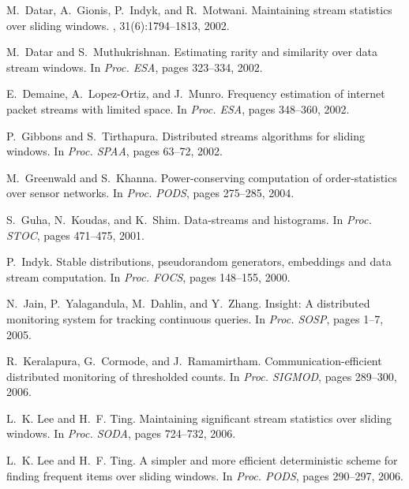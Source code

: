 \documentclass[proceedings]{stacs}
\theoremstyle{definition}\newtheorem{fact}{Fact}
\begin{document}
\begin{thebibliography}{10}
M.~Datar, A.~Gionis, P.~Indyk, and R.~Motwani.
\newblock Maintaining stream statistics over sliding windows.
, 31(6):1794--1813, 2002.

M.~Datar and S.~Muthukrishnan.
\newblock Estimating rarity and similarity over data stream windows.
\newblock In {\em Proc. ESA}, pages 323--334, 2002.

E.~Demaine, A.~Lopez-Ortiz, and J.~Munro.
\newblock Frequency estimation of internet packet streams with limited space.
\newblock In {\em Proc. ESA}, pages 348--360, 2002.





P.~Gibbons and S.~Tirthapura.
\newblock Distributed streams algorithms for sliding windows.
\newblock In {\em Proc. SPAA}, pages 63--72, 2002.

M.~Greenwald and S.~Khanna.
\newblock Power-conserving computation of order-statistics over sensor
  networks.
\newblock In {\em Proc. PODS}, pages 275--285, 2004.

S.~Guha, N.~Koudas, and K.~Shim.
\newblock Data-streams and histograms.
\newblock In {\em Proc. STOC}, pages 471--475, 2001.



P.~Indyk.
\newblock Stable distributions, pseudorandom generators, embeddings and data
  stream computation.
\newblock In {\em Proc. FOCS}, pages 148--155, 2000.

N.~Jain, P.~Yalagandula, M.~Dahlin, and Y.~Zhang.
\newblock Insight: A distributed monitoring system for tracking continuous
  queries.
\newblock In {\em Proc. SOSP}, pages 1--7, 2005.

R.~Keralapura, G.~Cormode, and J.~Ramamirtham.
\newblock Communication-efficient distributed monitoring of thresholded counts.
\newblock In {\em Proc. SIGMOD}, pages 289--300, 2006.

L.~K. Lee and H.~F. Ting.
\newblock Maintaining significant stream statistics over sliding windows.
\newblock In {\em Proc. SODA}, pages 724--732, 2006.

L.~K. Lee and H.~F. Ting.
\newblock A simpler and more efficient deterministic scheme for finding
  frequent items over sliding windows.
\newblock In {\em Proc. PODS}, pages 290--297, 2006.


\end{thebibliography}
\end{document}
